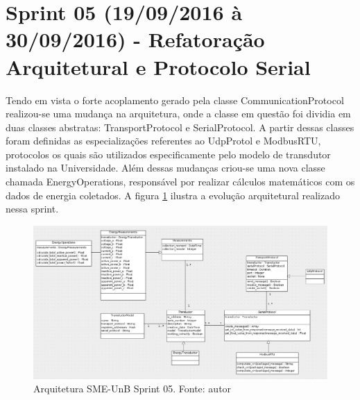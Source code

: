 \section{Sprint 05 (19/09/2016 à 30/09/2016) - Refatoração Arquitetural e Protocolo Serial}
Tendo em vista o forte acoplamento gerado pela classe CommunicationProtocol realizou-se uma mudança na arquitetura, onde a classe em questão foi dividia em duas classes abstratas: TransportProtocol e SerialProtocol. A partir dessas classes foram definidas as especializações referentes ao UdpProtol e ModbusRTU, protocolos os quais são utilizados especificamente pelo modelo de transdutor instalado na Universidade. Além dessas mudanças criou-se uma nova classe chamada EnergyOperations, responsável por realizar cálculos matemáticos com os dados de energia coletados. A figura \ref{sprint05arq} ilustra a evolução arquitetural realizado nessa sprint.
\begin{figure}[!htpb]
    \centering
    \includegraphics[scale=0.5,angle=90]{figuras/sprint05arq.eps}
    \caption{Arquitetura SME-UnB Sprint 05. Fonte: autor}
    \label{sprint05arq}
\end{figure}

